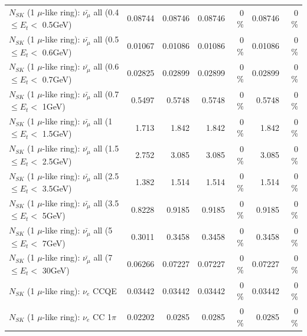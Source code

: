 \begin{table}
\begin{tabular}{| l | r | r | r  r | r  r |}
 $N_{SK}$ (1 $\mu$-like ring): $\bar{\nu_{\mu}}$ all (0.4 $\leq E_{t} <$ 0.5GeV) &         0.08744 &         0.08746 &         0.08746 &        0 \%  &         0.08746 &        0 \%  \\ 
 $N_{SK}$ (1 $\mu$-like ring): $\bar{\nu_{\mu}}$ all (0.5 $\leq E_{t} <$ 0.6GeV) &         0.01067 &         0.01086 &         0.01086 &        0 \%  &         0.01086 &        0 \%  \\ 
 $N_{SK}$ (1 $\mu$-like ring): $\bar{\nu_{\mu}}$ all (0.6 $\leq E_{t} <$ 0.7GeV) &         0.02825 &         0.02899 &         0.02899 &        0 \%  &         0.02899 &        0 \%  \\ 
   $N_{SK}$ (1 $\mu$-like ring): $\bar{\nu_{\mu}}$ all (0.7 $\leq E_{t} <$ 1GeV) &          0.5497 &          0.5748 &          0.5748 &        0 \%  &          0.5748 &        0 \%  \\ 
   $N_{SK}$ (1 $\mu$-like ring): $\bar{\nu_{\mu}}$ all (1 $\leq E_{t} <$ 1.5GeV) &           1.713 &           1.842 &           1.842 &        0 \%  &           1.842 &        0 \%  \\ 
 $N_{SK}$ (1 $\mu$-like ring): $\bar{\nu_{\mu}}$ all (1.5 $\leq E_{t} <$ 2.5GeV) &           2.752 &           3.085 &           3.085 &        0 \%  &           3.085 &        0 \%  \\ 
 $N_{SK}$ (1 $\mu$-like ring): $\bar{\nu_{\mu}}$ all (2.5 $\leq E_{t} <$ 3.5GeV) &           1.382 &           1.514 &           1.514 &        0 \%  &           1.514 &        0 \%  \\ 
   $N_{SK}$ (1 $\mu$-like ring): $\bar{\nu_{\mu}}$ all (3.5 $\leq E_{t} <$ 5GeV) &          0.8228 &          0.9185 &          0.9185 &        0 \%  &          0.9185 &        0 \%  \\ 
     $N_{SK}$ (1 $\mu$-like ring): $\bar{\nu_{\mu}}$ all (5 $\leq E_{t} <$ 7GeV) &          0.3011 &          0.3458 &          0.3458 &        0 \%  &          0.3458 &        0 \%  \\ 
    $N_{SK}$ (1 $\mu$-like ring): $\bar{\nu_{\mu}}$ all (7 $\leq E_{t} <$ 30GeV) &         0.06266 &         0.07227 &         0.07227 &        0 \%  &         0.07227 &        0 \%  \\ 
\hline
\hline
\hline
                                      $N_{SK}$ (1 $\mu$-like ring): $\nu_e$ CCQE &         0.03442 &         0.03442 &         0.03442 &        0 \%  &         0.03442 &        0 \%  \\ 
                                 $N_{SK}$ (1 $\mu$-like ring): $\nu_e$ CC 1$\pi$ &         0.02202 &          0.0285 &          0.0285 &        0 \%  &          0.0285 &        0 \%  \\ 

\end{tabular}
\end{table}
